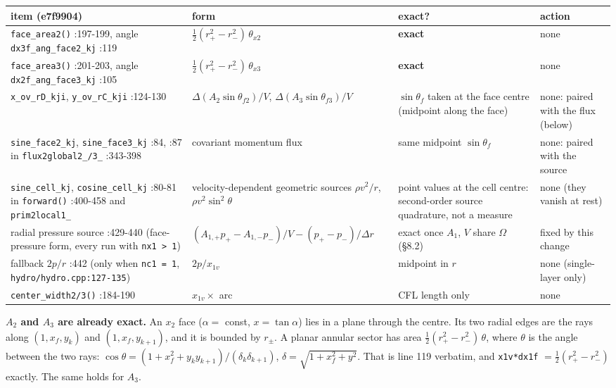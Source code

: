 \documentclass[11pt,a4paper]{article}
\begin{document}
\begin{longtable}{llll}
\toprule
item (e7f9904) & form & exact? & action \\
\midrule
\texttt{face\_area2()} :197-199, angle \texttt{dx3f\_ang\_face2\_kj} :119 & $\tfrac12(r_+^2-r_-^2)\,\theta_{x2}$ & \textbf{exact} & none \\
\texttt{face\_area3()} :201-203, angle \texttt{dx2f\_ang\_face3\_kj} :105 & $\tfrac12(r_+^2-r_-^2)\,\theta_{x3}$ & \textbf{exact} & none \\
\texttt{x\_ov\_rD\_kji}, \texttt{y\_ov\_rC\_kji} :124-130 & $\Delta(A_2\sin\theta_{f2})/V$, $\Delta(A_3\sin\theta_{f3})/V$ & $\sin\theta_f$ taken at the face centre (midpoint along the face) & none: paired with the flux (below) \\
\texttt{sine\_face2\_kj}, \texttt{sine\_face3\_kj} :84, :87 in \texttt{flux2global2\_/3\_} :343-398 & covariant momentum flux & same midpoint $\sin\theta_f$ & none: paired with the source \\
\texttt{sine\_cell\_kj}, \texttt{cosine\_cell\_kj} :80-81 in \texttt{forward()} :400-458 and \texttt{prim2local1\_} & velocity-dependent geometric sources $\rho v^2/r$, $\rho v^2\sin^2\theta$ & point values at the cell centre: second-order source quadrature, not a measure & none (they vanish at rest) \\
radial pressure source :429-440 (face-pressure form, every run with \texttt{nx1 > 1}) & $(A_{1,+}p_+-A_{1,-}p_-)/V-(p_+-p_-)/\Delta r$ & exact once $A_1$, $V$ share $\Omega$ (§8.2) & fixed by this change \\
fallback $2p/r$ :442 (only when \texttt{nc1 = 1}, \texttt{hydro/hydro.cpp:127-135}) & $2p/x_{1v}$ & midpoint in $r$ & none (single-layer only) \\
\texttt{center\_width2/3()} :184-190 & $x_{1v}\times$ arc & CFL length only & none \\
\bottomrule
\end{longtable}

\textbf{$A_2$ and $A_3$ are already exact.} An $x_2$ face ($\alpha=$ const, $x=\tan\alpha$) lies in a plane through
the centre. Its two radial edges are the rays along $(1, x_f, y_k)$ and $(1, x_f, y_{k+1})$, and it is bounded by
$r_\pm$. A planar annular sector has area $\tfrac12(r_+^2-r_-^2)\,\theta$, where $\theta$ is the angle between the
two rays:
$\cos\theta = (1+x_f^2+y_ky_{k+1})/(\delta_k\delta_{k+1})$, $\delta=\sqrt{1+x_f^2+y^2}$.
That is line 119 verbatim, and \texttt{x1v*dx1f} $=\tfrac12(r_+^2-r_-^2)$ exactly. The same holds for $A_3$.
\end{document}
